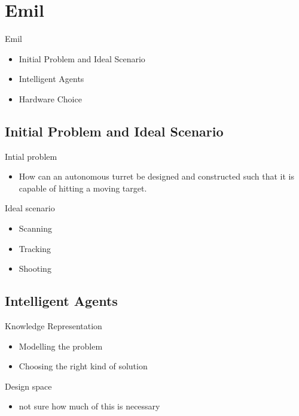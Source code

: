 \section{Emil}
\begin{frame}{Emil}
\begin{itemize}
  \item Initial Problem and Ideal Scenario
  \item Intelligent Agents
  \item Hardware Choice
\end{itemize}
\end{frame}

\subsection{Initial Problem and Ideal Scenario}
\begin{frame}{Intial problem}
\begin{itemize}
\item How can an autonomous turret be designed and constructed such
that it is capable of hitting a moving target.
\end{itemize}
\end{frame}

\begin{frame}{Ideal scenario}
\begin{itemize}
  \item Scanning
  \item Tracking
  \item Shooting
\end{itemize}
\end{frame}

\subsection{Intelligent Agents}
\begin{frame}{Knowledge Representation}
\begin{itemize}
  \item Modelling the problem
  \item Choosing the right kind of solution
\end{itemize}
\end{frame}

\begin{frame}{Design space}
\begin{itemize}
 \item not sure how much of this is necessary
\end{itemize}
\end{frame}

